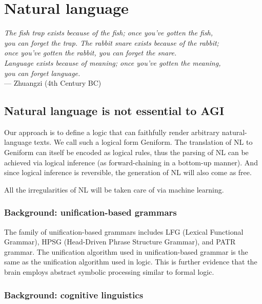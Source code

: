 \chapter{Natural language}
\label{ch:natural-language}
\begin{flushright}
\emph{The fish trap exists because of the fish; once you've gotten the fish,\\
you can forget the trap. The rabbit snare exists because of the rabbit;\\
once you've gotten the rabbit, you can forget the snare.\\
Language exists because of meaning; once you've gotten the meaning,\\
you can forget language.}\\ --- Zhuangzi (4th Century BC)
\end{flushright}
\minitoc

\section{Natural language is not essential to AGI}

Our approach is to define a logic that can faithfully render arbitrary natural-language texts.  We call such a logical form Geniform.  The translation of NL to Geniform can itself be encoded as logical rules, thus the parsing of NL can be achieved via logical inference (as forward-chaining in a bottom-up manner).  And since logical inference is reversible, the generation of NL will also come as free.

All the irregularities of NL will be taken care of via machine learning.

\subsection{Background: unification-based grammars}

The family of unification-based grammars includes LFG (Lexical Functional Grammar), HPSG (Head-Driven Phrase Structure Grammar), and PATR grammar.  The unification algorithm used in unification-based grammar is the same as the unification algorithm used in logic.  This is further evidence that the brain employs abstract symbolic processing similar to formal logic.

\subsection{Background: cognitive linguistics}

